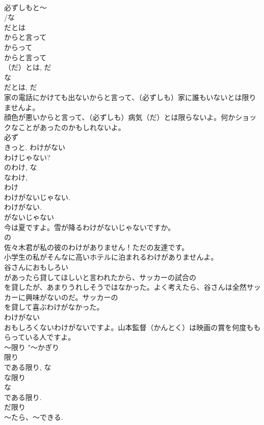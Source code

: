 \documentclass[8pt]{extreport}
\begin{document}
\begin{CJK}{UTF8}{min}
\\	必ずしもと～ 
\\	/な
\\	だとは 
\\	からと言って 
\\	からって 
\\	からと言って 
\\	（だ）とは, だ 
\\	な
\\	だとは, だ 
\\	家の電話にかけても出ないからと言って、（必ずしも）家に誰もいないとは限りませんよ。 
\\	顔色が悪いからと言って、（必ずしも）病気（だ）とは限らないよ。何かショックなことがあったのかもしれないよ。 
\\	必ず 
\\	きっと. わけがない 
\\	わけじゃない? 
\\	のわけ, な
\\	なわけ, 
\\	わけ 
\\	わけがないじゃない. 
\\	わけがない. 
\\	がないじゃない 
\\	今は夏ですよ。雪が降るわけがないじゃないですか。 
\\	の 
\\	佐々木君が私の彼のわけがありません！ただの友達です。 
\\	小学生の私がそんなに高いホテルに泊まれるわけがありませんよ。 
\\	谷さんにおもしろい
\\	があったら貸してほしいと言われたから、サッカーの試合の
\\	を貸したが、あまりうれしそうではなかった。よく考えたら、谷さんは全然サッカーに興味がないのだ。サッカーの
\\	を貸して喜ぶわけがなかった。 
\\	わけがない 
\\	おもしろくないわけがないですよ。山本監督（かんとく）は映画の賞を何度ももらっている人ですよ。
\\	～限り	"～かぎり 
\\	限り 
\\	である限り, な
\\	な限り 
\\	な
\\	である限り. 
\\	だ限り 
\\	～たら、～できる. 

\end{CJK}
\end{document}
